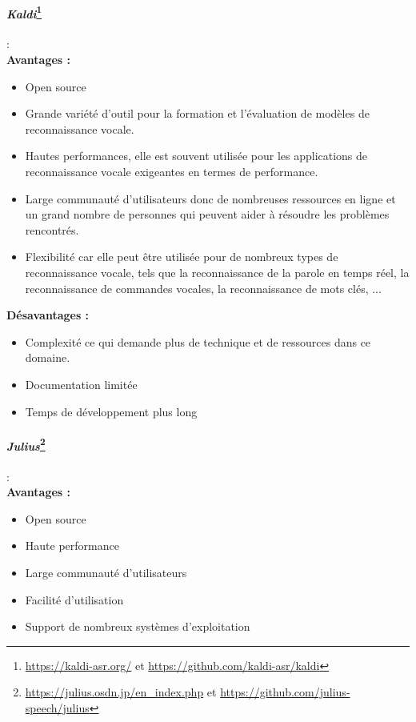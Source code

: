 \paragraph*{\textbf{\textit{Kaldi}}\footnote{\url{https://kaldi-asr.org/} et \url{https://github.com/kaldi-asr/kaldi}}}:\\

\textbf{Avantages :}
\begin{itemize}

    \item Open source
    \item Grande variété d'outil pour la formation et l'évaluation de modèles de reconnaissance vocale.
    \item Hautes performances, elle est souvent utilisée pour les applications de reconnaissance vocale exigeantes en termes de performance.
    \item Large communauté d'utilisateurs donc de nombreuses ressources en ligne et un grand nombre de personnes qui peuvent aider à résoudre les problèmes rencontrés.
    \item Flexibilité car elle peut être utilisée pour de nombreux types de reconnaissance vocale, tels que la reconnaissance de la parole en temps réel,
          la reconnaissance de commandes vocales, la reconnaissance de mots clés, ...

\end{itemize}

\textbf{Désavantages :}
\begin{itemize}
    \item Complexité ce qui demande plus de technique et de ressources dans ce domaine.
    \item Documentation limitée
    \item Temps de développement plus long
\end{itemize}

\paragraph*{\textbf{\textit{Julius}}\footnote{\url{https://julius.osdn.jp/en_index.php} et \url{https://github.com/julius-speech/julius}}}: \\

\textbf{Avantages :}
\begin{itemize}
    \item Open source
    \item Haute performance
    \item Large communauté d'utilisateurs
    \item Facilité d'utilisation
    \item Support de nombreux systèmes d'exploitation
\end{itemize}

